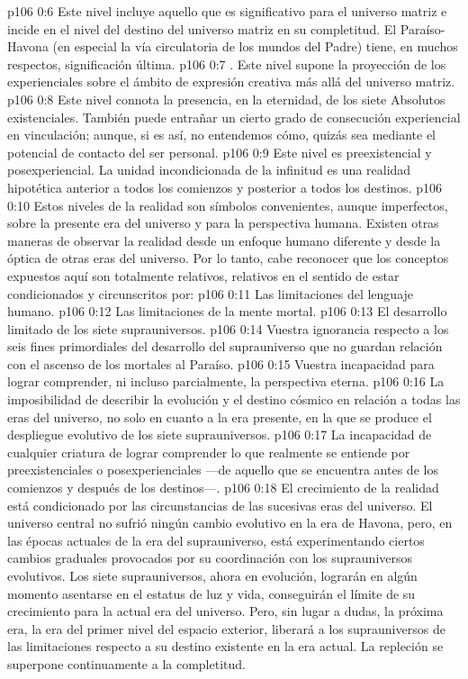 \vs p106 0:6  Este nivel incluye aquello que es significativo para el universo matriz e incide en el nivel del destino del universo matriz en su completitud. El Paraíso\hyp{}Havona (en especial la vía circulatoria de los mundos del Padre) tiene, en muchos respectos, significación última.
\vs p106 0:7 . Este nivel supone la proyección de los experienciales sobre el ámbito de expresión creativa más allá del universo matriz.
\vs p106 0:8  Este nivel connota la presencia, en la eternidad, de los siete Absolutos existenciales. También puede entrañar un cierto grado de consecución experiencial en vinculación; aunque, si es así, no entendemos cómo, quizás sea mediante el potencial de contacto del ser personal.
\vs p106 0:9  Este nivel es preexistencial y posexperiencial. La unidad incondicionada de la infinitud es una realidad hipotética anterior a todos los comienzos y posterior a todos los destinos.
\vs p106 0:10 \pc Estos niveles de la realidad son símbolos convenientes, aunque imperfectos, sobre la presente era del universo y para la perspectiva humana. Existen otras maneras de observar la realidad desde un enfoque humano diferente y desde la óptica de otras eras del universo. Por lo tanto, cabe reconocer que los conceptos expuestos aquí son totalmente relativos, relativos en el sentido de estar condicionados y circunscritos por:
\vs p106 0:11 Las limitaciones del lenguaje humano.
\vs p106 0:12 Las limitaciones de la mente mortal.
\vs p106 0:13 El desarrollo limitado de los siete suprauniversos.
\vs p106 0:14 Vuestra ignorancia respecto a los seis fines primordiales del desarrollo del suprauniverso que no guardan relación con el ascenso de los mortales al Paraíso.
\vs p106 0:15 Vuestra incapacidad para lograr comprender, ni incluso parcialmente, la perspectiva eterna.
\vs p106 0:16 La imposibilidad de describir la evolución y el destino cósmico en relación a todas las eras del universo, no solo en cuanto a la era presente, en la que se produce el despliegue evolutivo de los siete suprauniversos.
\vs p106 0:17 La incapacidad de cualquier criatura de lograr comprender lo que realmente se entiende por preexistenciales o posexperienciales ---de aquello que se encuentra antes de los comienzos y después de los destinos---.
\vs p106 0:18 \pc El crecimiento de la realidad está condicionado por las circunstancias de las sucesivas eras del universo. El universo central no sufrió ningún cambio evolutivo en la era de Havona, pero, en las épocas actuales de la era del suprauniverso, está experimentando ciertos cambios graduales provocados por su coordinación con los suprauniversos evolutivos. Los siete suprauniversos, ahora en evolución, lograrán en algún momento asentarse en el estatus de luz y vida, conseguirán el límite de su crecimiento para la actual era del universo. Pero, sin lugar a dudas, la próxima era, la era del primer nivel del espacio exterior, liberará a los suprauniversos de las limitaciones respecto a su destino existente en la era actual. La repleción se superpone continuamente a la completitud.
